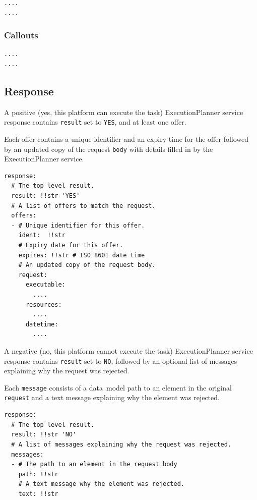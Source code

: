 \documentclass[11pt,a4paper]{ivoa}
\newcommand{\datamodel} {data~model}
\newcommand{\execplanner} {ExecutionPlanner}
\newcommand{\codeword}[1] {\texttt{#1}}
\begin{document}
\begin{lstlisting}[]
....
....
\end{lstlisting}

\subsubsection{Callouts}
\label{datamodel-callouts}

\begin{lstlisting}[]
....
....
\end{lstlisting}




\subsection{Response}
\label{datamodel-response}

A positive (yes, this platform can execute the task) \execplanner{} service response contains \codeword{result}
set to \codeword{YES}, and at least one offer.

Each offer contains a unique identifier and an expiry time for the offer
followed by an updated copy of the request \codeword{body} with details
filled in by the \execplanner{} service.

\begin{lstlisting}[]
response:
  # The top level result.
  result: !!str 'YES'
  # A list of offers to match the request.
  offers:
  - # Unique identifier for this offer.
    ident:  !!str
    # Expiry date for this offer.
    expires: !!str # ISO 8601 date time
    # An updated copy of the request body.
    request:
      executable:
        ....
      resources:
        ....
      datetime:
        ....
\end{lstlisting}

A negative (no, this platform cannot execute the task) \execplanner{} service response contains \codeword{result}
set to \codeword{NO}, followed by an optional list of messages
explaining why the request was rejected.

Each \codeword{message} consists of a \datamodel{} path to an element in the original
\codeword{request} and a text message explaining why the element was rejected.

\begin{lstlisting}[]
response:
  # The top level result.
  result: !!str 'NO'
  # A list of messages explaining why the request was rejected.
  messages:
  - # The path to an element in the request body
    path: !!str
    # A text message why the element was rejected.
    text: !!str
\end{lstlisting}
\end{document}
